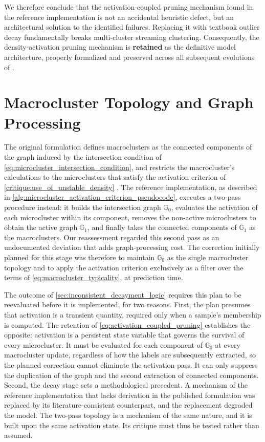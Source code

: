 We therefore conclude that the activation-coupled pruning mechanism found in the reference implementation is not an accidental heuristic defect, but an architectural solution to the identified failures. Replacing it with textbook outlier decay fundamentally breaks multi-cluster streaming clustering. Consequently, the density-activation pruning mechanism is \textbf{retained} as the definitive model architecture, properly formalized and preserved across all subsequent evolutions of \MicroTEDAClus.

\section{Macrocluster Topology and Graph Processing}
\label{sec:macrocluster_topology}

The original \MicroTEDAClus formulation defines macroclusters as the connected components of the graph induced by the intersection condition of \cref{eq:microcluster_intersection_condition}, and restricts the macrocluster's calculations to the microclusters that satisfy the activation criterion of \cref{critique:use_of_unstable_density} \cite{maia2020evolvclus}. The reference implementation, as described in \cref{alg:microcluster_activation_criterion_pseudocode}, executes a two-pass procedure instead: it builds the intersection graph $\mathbb{G}_0$, evaluates the activation of each microcluster within its component, removes the non-active microclusters to obtain the active graph $\mathbb{G}_1$, and finally takes the connected components of $\mathbb{G}_1$ as the macroclusters. Our reassessment regarded this second pass as an undocumented deviation that adds graph-processing cost. The correction initially planned for this stage was therefore to maintain $\mathbb{G}_0$ as the single macrocluster topology and to apply the activation criterion exclusively as a filter over the terms of \cref{eq:macrocluster_typicality}, at prediction time.

The outcome of \cref{sec:inconsistent_decayment_logic} requires this plan to be reevaluated before it is implemented, for two reasons. First, the plan presumes that activation is a transient quantity, required only when a sample's membership is computed. The retention of \cref{eq:activation_coupled_pruning} establishes the opposite: activation is a persistent state variable that governs the survival of every microcluster. It must be evaluated for each component of $\mathbb{G}_0$ at every macrocluster update, regardless of how the labels are subsequently extracted, so the planned correction cannot eliminate the activation pass. It can only suppress the duplication of the graph and the second extraction of connected components. Second, the decay stage sets a methodological precedent. A mechanism of the reference implementation that lacks derivation in the published formulation was replaced by its literature-consistent counterpart, and the replacement degraded the model. The two-pass topology is a mechanism of the same nature, and it is built upon the same activation state. Its critique must thus be tested rather than assumed.

